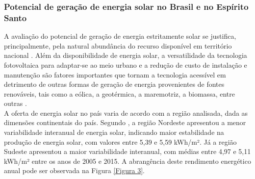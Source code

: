 \begin{onehalfspace}
    \subsubsection{Potencial de geração de energia solar no Brasil e no Espírito Santo}
    A avaliação do potencial de geração de energia estritamente solar se justifica, principalmente, 
    pela natural abundância do recurso disponível em território nacional \cite{Pereira2017}. Além 
    da disponibilidade de energia solar, a versatilidade da tecnologia fotovoltaica para adaptar-se 
    ao meio urbano e a redução de custo de instalação e manutenção são fatores importantes que 
    tornam a tecnologia acessível em detrimento de outras formas de geração de energia provenientes 
    de fontes renováveis, tais como a eólica, a geotérmica, a maremotriz, a biomassa, entre outras 
    \cite{AgenciadeRegulacaodeServicosPublicosdoEspiritoSanto-ARSP2019,Didone2014,Didone2014a,InternationalEnergyAgency-IEA2019b,UnitedNationsEnvironmentProgramme-UNEP2019}.\vspace{0.3cm} \\
    A oferta de energia solar no país varia de acordo com a região analisada, dada as dimensões 
    continentais do país. Segundo \textcite{Pereira2017}, a região Nordeste apresentou a menor 
    variabilidade interanual de energia solar, indicando maior estabilidade na produção de energia 
    solar, com valores entre 5,39 e 5,59 kWh/m². Já a região Sudeste apresentou a maior variabilidade 
    interanual, com médias entre 4,97 e 5,11 kWh/m² entre os anos de 2005 e 2015. A abrangência deste 
    rendimento energético anual pode ser observada na Figura \ref{Figura 3}.


\end{onehalfspace}
